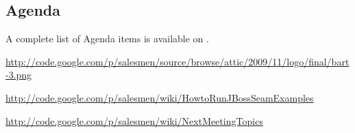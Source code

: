\documentclass[a4paper, 12pt]{article}
\begin{document}
		\subsection{Agenda}
A complete list of Agenda items is available on \cite{site6}.\\
	
	\begin{thebibliography}{99}
		\href{http://code.google.com/p/salesmen/source/browse/attic/2009/11/logo/final/bart-3.png}{http://code.google.com/p/salesmen/source/browse/attic/2009/11/logo/final/bart-3.png}
		
			\href{http://code.google.com/p/salesmen/wiki/HowtoRunJBossSeamExamples}{http://code.google.com/p/salesmen/wiki/HowtoRunJBossSeamExamples}
		
		
		\href{http://code.google.com/p/salesmen/wiki/NextMeetingTopics}{http://code.google.com/p/salesmen/wiki/NextMeetingTopics}

		
	\end{thebibliography}	
		
\end{document}
